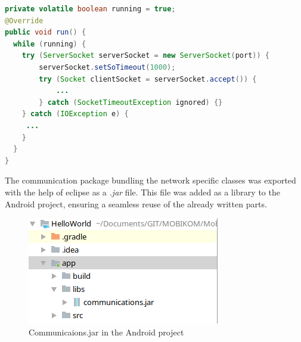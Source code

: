 \begin{minipage}{\linewidth}
	\begin{lstlisting}[language=Java, caption={Run method of TCPServerTask},captionpos=b,label=lst:runServer]
private volatile boolean running = true;
@Override
public void run() {
  while (running) {
	try (ServerSocket serverSocket = new ServerSocket(port)) {
		serverSocket.setSoTimeout(1000);
		try (Socket clientSocket = serverSocket.accept()) {
			...
		} catch (SocketTimeoutException ignored) {}
	} catch (IOException e) {
	 ...
	}
  }
}
	\end{lstlisting}
\end{minipage}

The communication package bundling the network specific classes was exported with the help of eclipse as a \textit{.jar} file. This file was added as a library to the Android project, ensuring a seamless reuse of the already written parts.

\begin{figure}[H]
	\centering
	\includegraphics[width=0.5\linewidth]{images/task1/jar.png}
	\caption{Communicaions.jar in the Android project}
	\label{fig:jar}
\end{figure}